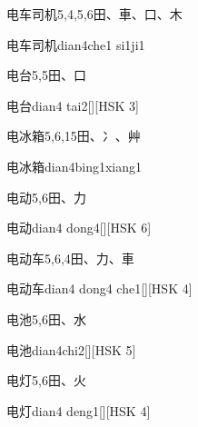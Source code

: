 \begin{Entry}{电车司机}{5,4,5,6}{⽥、⾞、⼝、⽊}
  \begin{Phonetics}{电车司机}{dian4che1 si1ji1}
  \end{Phonetics}
\end{Entry}

\begin{Entry}{电台}{5,5}{⽥、⼝}
  \begin{Phonetics}{电台}{dian4 tai2}[][HSK 3]
  \end{Phonetics}
\end{Entry}

\begin{Entry}{电冰箱}{5,6,15}{⽥、⼎、⾋}
  \begin{Phonetics}{电冰箱}{dian4bing1xiang1}
  \end{Phonetics}
\end{Entry}

\begin{Entry}{电动}{5,6}{⽥、⼒}
  \begin{Phonetics}{电动}{dian4 dong4}[][HSK 6]
  \end{Phonetics}
\end{Entry}

\begin{Entry}{电动车}{5,6,4}{⽥、⼒、⾞}
  \begin{Phonetics}{电动车}{dian4 dong4 che1}[][HSK 4]
  \end{Phonetics}
\end{Entry}

\begin{Entry}{电池}{5,6}{⽥、⽔}
  \begin{Phonetics}{电池}{dian4chi2}[][HSK 5]
  \end{Phonetics}
\end{Entry}

\begin{Entry}{电灯}{5,6}{⽥、⽕}
  \begin{Phonetics}{电灯}{dian4 deng1}[][HSK 4]
  \end{Phonetics}
\end{Entry}

